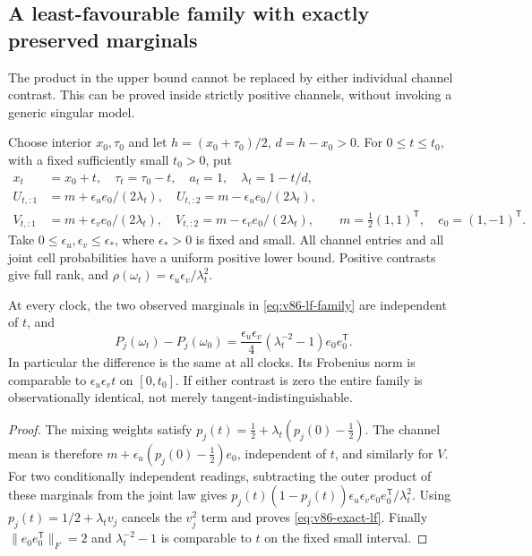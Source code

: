 \subsection{A least-favourable family with exactly preserved marginals}
The product in the upper bound cannot be replaced by either individual
channel contrast. This can be proved inside strictly positive channels,
without invoking a generic singular model.

Choose interior $x_0,\tau_0$ and let $h=(x_0+\tau_0)/2$,
$d=h-x_0>0$. For $0\le t\le t_0$, with a fixed sufficiently small
$t_0>0$, put
\begin{align}
 x_t&=x_0+t,\quad \tau_t=\tau_0-t,\quad a_t=1,\quad
 \lambda_t=1-t/d,\nonumber\\
 U_{t,:1}&=m+\epsilon_u e_0/(2\lambda_t),\quad
 U_{t,:2}=m-\epsilon_u e_0/(2\lambda_t),\nonumber\\
 V_{t,:1}&=m+\epsilon_v e_0/(2\lambda_t),\quad
 V_{t,:2}=m-\epsilon_v e_0/(2\lambda_t),\qquad
 m=\tfrac12(1,1)^{\mathsf T},\quad e_0=(1,-1)^{\mathsf T}.
                                                \label{eq:v86-lf-family}
\end{align}
Take $0\le\epsilon_u,\epsilon_v\le\epsilon_*$, where $\epsilon_*>0$
is fixed and small. All channel entries and all joint cell
probabilities have a uniform positive lower bound. Positive contrasts
give full rank, and
$\rho(\omega_t)=\epsilon_u\epsilon_v/\lambda_t^2$.

\begin{lemma}
\label{lem:v86-lf}
At every clock, the two observed marginals in
\eqref{eq:v86-lf-family} are independent of $t$, and
\begin{equation}\label{eq:v86-exact-lf}
       P_j(\omega_t)-P_j(\omega_0)
       =\frac{\epsilon_u\epsilon_v}{4}
                        (\lambda_t^{-2}-1)e_0e_0^{\mathsf T}.
\end{equation}
In particular the difference is the same at all clocks. Its Frobenius
norm is comparable to $\epsilon_u\epsilon_v t$ on $[0,t_0]$.
If either contrast is zero the entire family is observationally
identical, not merely tangent-indistinguishable.
\end{lemma}
\begin{proof}
The mixing weights satisfy
$p_j(t)=\tfrac12+\lambda_t(p_j(0)-\tfrac12)$.
The channel mean is therefore
$m+\epsilon_u(p_j(0)-\tfrac12)e_0$, independent of $t$, and similarly
for $V$. For two conditionally independent readings, subtracting the
outer product of these marginals from the joint law gives
$p_j(t)(1-p_j(t))\epsilon_u\epsilon_v e_0e_0^{\mathsf T}/\lambda_t^2$.
Using $p_j(t)=1/2+\lambda_tv_j$ cancels the $v_j^2$ term and proves
\eqref{eq:v86-exact-lf}. Finally
$\|e_0e_0^{\mathsf T}\|_F=2$ and
$\lambda_t^{-2}-1$ is comparable to $t$ on the fixed small interval.
\end{proof}

